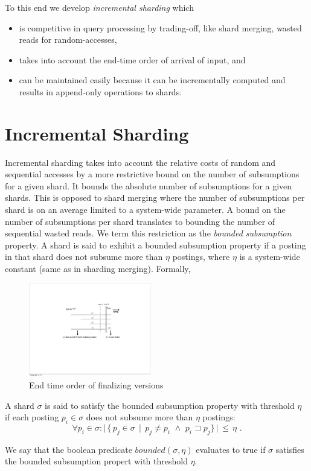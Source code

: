 To this end we develop \emph{incremental sharding} which
\begin{itemize}
	\item is competitive in query processing by trading-off, like shard merging, wasted reads for random-accesses, 

	\item takes into account the end-time order of arrival of input, and	
	\item can be maintained easily because it can be incrementally computed and results in append-only operations to shards.
\end{itemize}

\section{Incremental Sharding}
\label{chap:sharding:sec:inc_sharding}

Incremental sharding takes into account the relative costs of random and sequential accesses by a more restrictive bound on the number of subsumptions for a given shard. It bounds the absolute number of subsumptions for a given shards. This is opposed to shard merging where the number of subsumptions per shard is on an average limited to a system-wide parameter. A bound on the number of subsumptions per shard translates to bounding the number of sequential wasted reads. We term this restriction as the \emph{bounded subsumption} property. A shard is said to exhibit a bounded subsumption property if a posting in that shard does not subsume more than $\eta$ postings, where $\eta$ is a system-wide constant (same as in sharding merging). Formally,

\begin{figure}[tb]
	\centering
		\includegraphics[width=0.475\textwidth]{resources/sliding_wind_grayscale.pdf}
	\caption{End time order of finalizing versions}
	 \label{fig:finalizing_versions}
\end{figure}

\begin{definition}
A shard $\sigma$ is said to satisfy the bounded subsumption property with threshold $\eta$ if each posting $p_i \in \sigma$ does not subsume more than $\eta $ postings:
$$ \forall p_i \in \sigma: \vert \,\{ \, p_j \in \sigma \, \mid \, p_j \neq p_i \,\, \wedge \,\, p_i \sqsupset p_j \} \,\vert \,\leq \, \eta  \,\,.
$$

We say that the boolean predicate $bounded(\sigma, \eta)$ evaluates to true if $\sigma$ satisfies the bounded subsumption propert with threshold $\eta$.
\end{definition}

